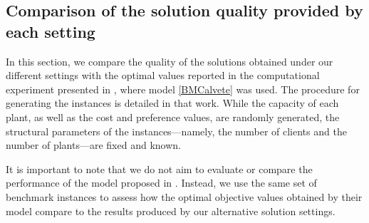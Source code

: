 \documentclass[preprint,11pt,authoryear]{elsarticle}
\newcommand\red[1]{{\color{red}#1}}
\begin{document}

\subsection{Comparison of the solution quality provided by each setting}

In this section, we compare the quality of the solutions obtained under our different settings with the optimal values reported in the computational experiment presented in \cite{calvete2020}, where model \eqref{BMCalvete} was used. The procedure for generating the instances is detailed in that work. While the capacity of each plant, as well as the cost and preference values, are randomly generated, the structural parameters of the instances---namely, the number of clients and the number of plants---are fixed and known.

It is important to note that we do not aim to evaluate or compare the performance of the model proposed in \cite{calvete2020}. Instead, we use the same set of benchmark instances to assess how the optimal objective values obtained by their model compare to the results produced by our alternative solution settings.
\end{document}
